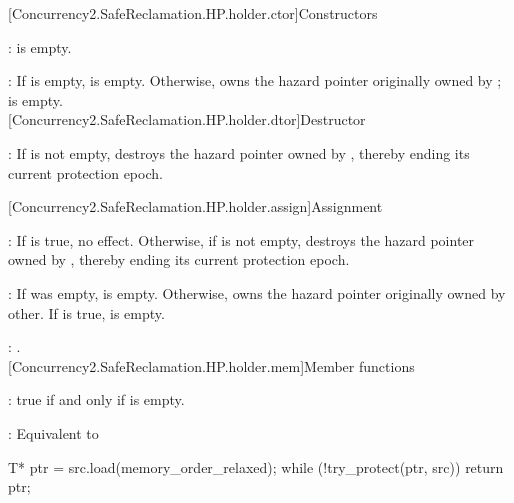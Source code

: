 [Concurrency2.SafeReclamation.HP.holder.ctor]{Constructors}


\pnum
{}:  is empty.
\\


\pnum
{}: If  is empty,  is empty. Otherwise,  owns the hazard pointer originally owned by ;  is empty.
\\

[Concurrency2.SafeReclamation.HP.holder.dtor]{Destructor}


\pnum
{}: If  is not empty, destroys the hazard pointer owned by , thereby ending its current protection epoch.

[Concurrency2.SafeReclamation.HP.holder.assign]{Assignment}


\pnum
{}: If  is true, no effect. Otherwise, if  is not empty, destroys
the hazard pointer owned by , thereby ending its current protection epoch.

\pnum
{}: If  was empty,  is empty. Otherwise,  owns the hazard
pointer originally owned by other. If  is true,  is empty.

\pnum
{}: .
\\

[Concurrency2.SafeReclamation.HP.holder.mem]{Member functions}


\pnum
{}: true if and only if  is empty.
\\


\pnum
{}: Equivalent to
\begin{codeblock}
T* ptr = src.load(memory_order_relaxed);
while (!try_protect(ptr, src)) {}
return ptr;
\end{codeblock}

